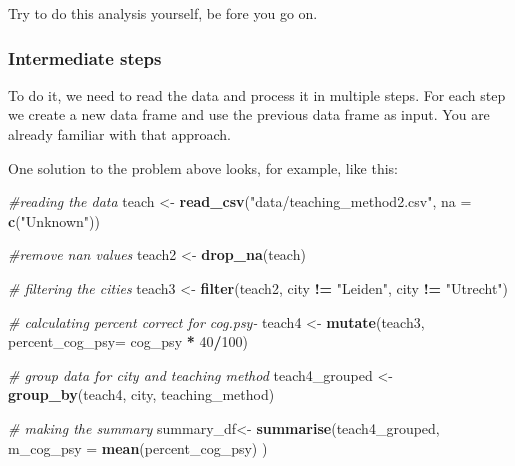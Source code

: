 \documentclass[
]{scrartcl}
\makeatletter
\newenvironment{Shaded}{\begin{snugshade}}{\end{snugshade}}
\newcommand{\AttributeTok}[1]{\textcolor[rgb]{0.13,0.29,0.53}{#1}}
\newcommand{\CommentTok}[1]{\textcolor[rgb]{0.56,0.35,0.01}{\textit{#1}}}
\newcommand{\DecValTok}[1]{\textcolor[rgb]{0.00,0.00,0.81}{#1}}
\newcommand{\FunctionTok}[1]{\textcolor[rgb]{0.13,0.29,0.53}{\textbf{#1}}}
\newcommand{\NormalTok}[1]{#1}
\newcommand{\OtherTok}[1]{\textcolor[rgb]{0.56,0.35,0.01}{#1}}
\newcommand{\SpecialCharTok}[1]{\textcolor[rgb]{0.81,0.36,0.00}{\textbf{#1}}}
\newcommand{\StringTok}[1]{\textcolor[rgb]{0.31,0.60,0.02}{#1}}
\newenvironment{kframe}{%
\medskip{}
\setlength{\fboxsep}{.8em}
 \def\at@end@of@kframe{}%
 \ifinner\ifhmode%
  \def\at@end@of@kframe{\end{minipage}}%
  \begin{minipage}{\columnwidth}%
 \fi\fi%
 \def\FrameCommand##1{\hskip\@totalleftmargin \hskip-\fboxsep
 \colorbox{shadecolor}{##1}\hskip-\fboxsep
     \hskip-\linewidth \hskip-\@totalleftmargin \hskip\columnwidth}%
 \MakeFramed {\advance\hsize-\width
   \@totalleftmargin\z@ \linewidth\hsize
   \@setminipage}}%
 {\par\unskip\endMakeFramed%
 \at@end@of@kframe}
\newenvironment{rmdblock}[1]
  {
  \begin{itemize}
  \renewcommand{\labelitemi}{
    \raisebox{-.7\height}[0pt][0pt]{
      {\setkeys{Gin}{width=3em,keepaspectratio}\texttt{[image: images/\#1]}}
    }
  }
  \setlength{\fboxsep}{1em}
  \begin{kframe}
  \item
  }
  {
  \end{kframe}
  \end{itemize}
  }
\newenvironment{myexercise}
    {\begin{rmdblock}{exercise_green}}
    {\end{rmdblock}}
\makeatother
\begin{document}
\begin{myexercise}
Try to do this analysis yourself, be fore you go on.
\end{myexercise}

\hypertarget{intermediatesteps}{%
\subsubsection{Intermediate steps}\label{intermediatesteps}}

To do it, we need to read the data and process it in multiple steps. For each step we create a new data frame and use the previous data frame as input. You are already familiar with that approach.

One solution to the problem above looks, for example, like this:

\begin{Shaded}
\begin{Highlighting}[]
\CommentTok{\#reading the data}
\NormalTok{teach }\OtherTok{\textless{}{-}} \FunctionTok{read\_csv}\NormalTok{(}\StringTok{"data/teaching\_method2.csv"}\NormalTok{, }\AttributeTok{na =} \FunctionTok{c}\NormalTok{(}\StringTok{"Unknown"}\NormalTok{))}
\end{Highlighting}
\end{Shaded}

\begin{Shaded}
\begin{Highlighting}[]
\CommentTok{\#remove nan values}
\NormalTok{teach2 }\OtherTok{\textless{}{-}} \FunctionTok{drop\_na}\NormalTok{(teach)}

\CommentTok{\# filtering the cities}
\NormalTok{teach3 }\OtherTok{\textless{}{-}} \FunctionTok{filter}\NormalTok{(teach2, city }\SpecialCharTok{!=} \StringTok{"Leiden"}\NormalTok{, city }\SpecialCharTok{!=} \StringTok{"Utrecht"}\NormalTok{)}

\CommentTok{\# calculating percent correct for cog.psy{-}}
\NormalTok{teach4 }\OtherTok{\textless{}{-}} \FunctionTok{mutate}\NormalTok{(teach3, }\AttributeTok{percent\_cog\_psy=}\NormalTok{ cog\_psy }\SpecialCharTok{*} \DecValTok{40}\SpecialCharTok{/}\DecValTok{100}\NormalTok{)}

\CommentTok{\# group data for city and teaching method}
\NormalTok{teach4\_grouped }\OtherTok{\textless{}{-}} \FunctionTok{group\_by}\NormalTok{(teach4, city, teaching\_method)}

\CommentTok{\# making the summary}
\NormalTok{summary\_df}\OtherTok{\textless{}{-}} \FunctionTok{summarise}\NormalTok{(teach4\_grouped,}
                        \AttributeTok{m\_cog\_psy =} \FunctionTok{mean}\NormalTok{(percent\_cog\_psy) )}
\end{Highlighting}
\end{Shaded}
\end{document}
